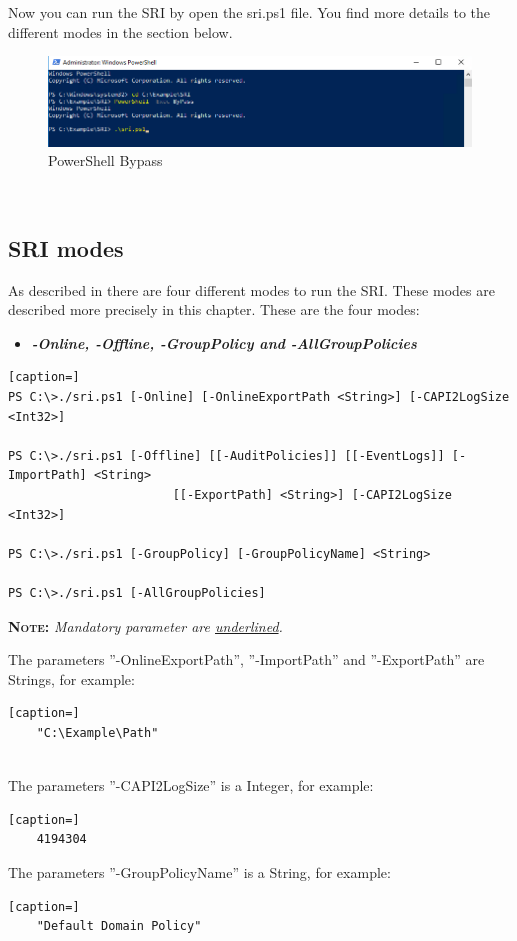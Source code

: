 Now you can run the SRI by open the sri.ps1 file. You find more details to the different modes in the section below.
\begin{figure}[H]
    \centering
    \includegraphics[width=1\linewidth]{assets/sri_ps1.png}
    \caption{PowerShell Bypass}
\end{figure} \ \\

\subsection{SRI modes}
As described in  there are four different modes to run the SRI. These modes are described more precisely in this chapter. These are the four modes:
\begin{itemize}
    \item \textbf{\textit{-Online, -Offline, -GroupPolicy and -AllGroupPolicies}}
\end{itemize}
\begin{lstlisting}[caption=]
PS C:\>./sri.ps1 [-Online] [-OnlineExportPath <String>] [-CAPI2LogSize <Int32>]

PS C:\>./sri.ps1 [-Offline] [[-AuditPolicies]] [[-EventLogs]] [-ImportPath] <String> 
                       [[-ExportPath] <String>] [-CAPI2LogSize <Int32>]

PS C:\>./sri.ps1 [-GroupPolicy] [-GroupPolicyName] <String>

PS C:\>./sri.ps1 [-AllGroupPolicies]
\end{lstlisting}

\vspace{0.5cm}
\textsc{\textbf{Note:}}\textit{ Mandatory parameter are \underline{underlined}.}
\vspace{0.5cm}

\clearpage
The parameters ''-OnlineExportPath'', ''-ImportPath'' and ''-ExportPath'' are Strings, for example:\ \\
\begin{lstlisting}[caption=]
    "C:\Example\Path"
\end{lstlisting} \ \\
The parameters ''-CAPI2LogSize'' is a Integer, for example:\ \\
\begin{lstlisting}[caption=]
    4194304
\end{lstlisting}
The parameters ''-GroupPolicyName'' is a String, for example:\ \\
\begin{lstlisting}[caption=]
    "Default Domain Policy"
\end{lstlisting}

